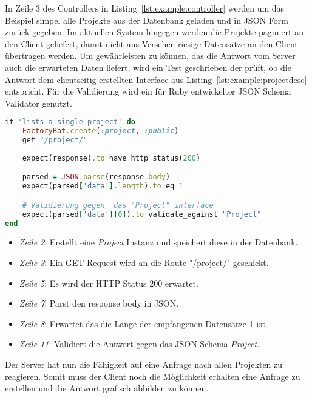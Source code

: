 In Zeile 3 des Controllers in Listing~\ref{lst:example:controller} werden um das Beispiel simpel alle Projekte aus der Datenbank geladen und in JSON Form
zurück gegeben. Im aktuellen System hingegen werden die Projekte paginiert an den Client geliefert, damit nicht aus Versehen riesige Datensätze an den Client übertragen werden. Um gewährleisten zu können, das die Antwort vom Server auch die erwarteten Daten liefert, wird ein
Test geschrieben der prüft, ob die Antwort dem clientseitig erstellten Interface aus Listing~\ref{lst:example:projectdesc} entspricht.
Für die Validierung wird ein für Ruby entwickelter JSON Schema Validator genutzt.

\begin{lstlisting}[language=Ruby,float=h!,caption={Test überprüft, ob bei Anfrage der Route '/project/' eine Antwort vom Typ Project folgt}, label={lst:example:controller-test}]
it 'lists a single project' do
	FactoryBot.create(:project, :public)
	get "/project/"
	
	expect(response).to have_http_status(200)

	parsed = JSON.parse(response.body)
	expect(parsed['data'].length).to eq 1

	# Validierung gegen  das "Project" interface
	expect(parsed['data'][0]).to validate_against "Project"
end
\end{lstlisting}


\begin{itemize}
	\setlength\itemsep{-1em}
	\item \emph{Zeile 2}: Erstellt eine \emph{Project} Instanz und speichert diese in der Datenbank.
	\item \emph{Zeile 3}: Ein GET Request wird an die Route "/project/" geschickt.
	\item \emph{Zeile 5}: Es wird der HTTP Status 200 erwartet. 
	\item \emph{Zeile 7}: Parst den response body in JSON.
	\item \emph{Zeile 8}: Erwartet das die Länge der empfangenen Datensätze 1 ist.
	\item \emph{Zeile 11}: Validiert die Antwort gegen das JSON Schema \emph{Project}.
\end{itemize}

Der Server hat nun die Fähigkeit auf eine Anfrage nach allen Projekten zu reagieren.
Somit muss der Client noch die Möglichkeit erhalten eine Anfrage zu erstellen und die Antwort grafisch abbilden zu können.

